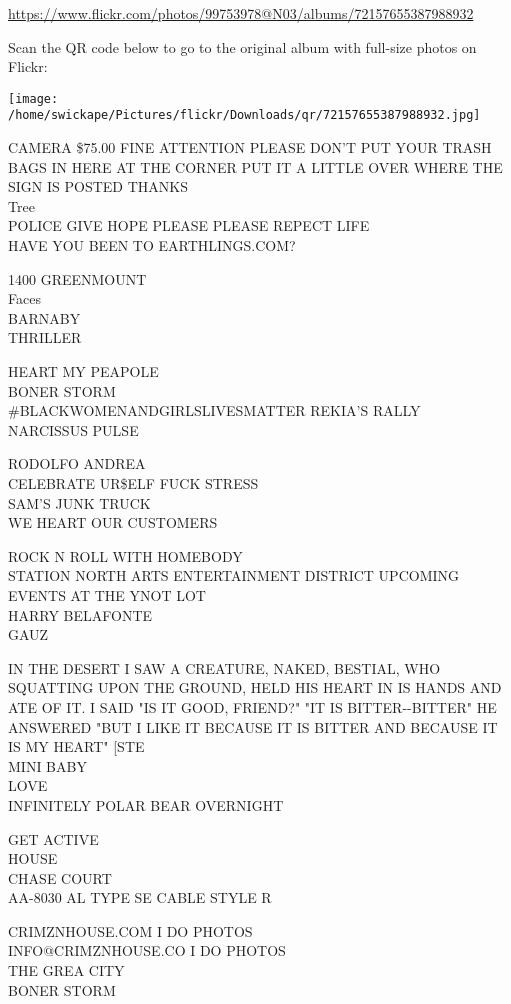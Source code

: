 \documentclass[10pt,letterpaper]{article}
\begin{document}
\url{https://www.flickr.com/photos/99753978@N03/albums/72157655387988932}

Scan the QR code below to go to the original album with full-size photos on Flickr:

\texttt{[image: /home/swickape/Pictures/flickr/Downloads/qr/72157655387988932.jpg]}


CAMERA \$75.00 FINE ATTENTION PLEASE DON'T PUT YOUR TRASH BAGS IN HERE AT THE CORNER PUT IT A LITTLE OVER WHERE THE SIGN IS POSTED THANKS\\
Tree\\
POLICE GIVE HOPE PLEASE PLEASE REPECT LIFE\\
HAVE YOU BEEN TO EARTHLINGS.COM?

1400 GREENMOUNT\\
Faces\\
BARNABY\\
THRILLER

HEART MY PEAPOLE\\
BONER STORM\\
\#BLACKWOMENANDGIRLSLIVESMATTER REKIA'S RALLY\\
NARCISSUS PULSE

RODOLFO ANDREA\\
CELEBRATE UR\$ELF FUCK STRESS\\
SAM'S JUNK TRUCK\\
WE HEART OUR CUSTOMERS

ROCK N ROLL WITH HOMEBODY\\
STATION NORTH ARTS ENTERTAINMENT DISTRICT UPCOMING EVENTS AT THE YNOT LOT\\
HARRY BELAFONTE\\
GAUZ

IN THE DESERT I SAW A CREATURE, NAKED, BESTIAL, WHO SQUATTING UPON THE GROUND, HELD HIS HEART IN IS HANDS AND ATE OF IT.  I SAID "IS IT GOOD, FRIEND?"  "IT IS BITTER{-}{-}BITTER" HE ANSWERED "BUT I LIKE IT BECAUSE IT IS BITTER AND BECAUSE IT IS MY HEART" {[}STE\\
MINI BABY\\
LOVE\\
INFINITELY POLAR BEAR OVERNIGHT

GET ACTIVE\\
HOUSE\\
CHASE COURT\\
AA{-}8030 AL TYPE SE CABLE STYLE R

CRIMZNHOUSE.COM I DO PHOTOS\\
INFO@CRIMZNHOUSE.CO I DO PHOTOS\\
THE GREA CITY\\
BONER STORM
\end{document}
